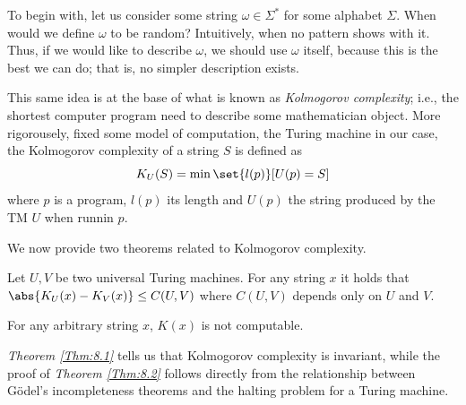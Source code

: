 \documentclass{subfiles}
\begin{document}
    To begin with, let us consider some string \(\omega \in \Sigma^{*}\) for some 
        alphabet \(\Sigma\). When would we define \(\omega\) to be random?
        Intuitively, when no pattern shows with it. Thus,
        if we would like to describe \(\omega\), we should use \(\omega\) itself,
        because this is the best we can do; that is, no simpler description exists.

    This same idea is at the base of what is known as \emph{Kolmogorov complexity};
        i.e., the shortest computer program need to describe some mathematician object.
        More rigorousely, fixed some model of computation, the Turing machine in our case,
        the Kolmogorov complexity of a string \(S\) is defined as 
        \[
            K_{U}(S) = \min{\set{l(p)}[U(p) = S]}
        \]
        where \(p\) is a program, \(l(p)\) its length and \(U(p)\) the string produced 
        by the TM \(U\) when runnin \(p\).

    We now provide two theorems related to Kolmogorov complexity.
    \begin{theorem}\label{Thm:8.1}
        Let \(U, V\) be two universal Turing machines. For any string \(x\)
        it holds that \(\abs{K_{U}(x) - K_{V}(x)} \le C(U, V)\) where \(C(U, V)\)
        depends only on \(U\) and \(V\).
    \end{theorem}

    \begin{theorem}\label{Thm:8.2}
        For any arbitrary string \(x\), \(K(x)\) is not computable.
    \end{theorem}

    \emph{Theorem \ref{Thm:8.1}} tells us that Kolmogorov complexity is invariant,
        while the proof of \emph{Theorem \ref{Thm:8.2}} follows directly from the relationship 
        between G\"odel's incompleteness theorems and the halting problem for a Turing machine.
\end{document}
